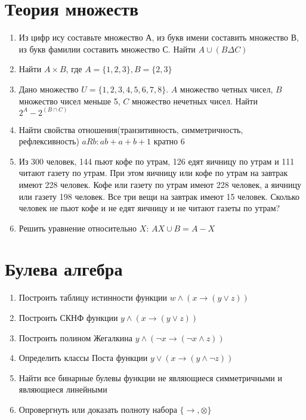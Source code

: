 \documentclass{paper}
\begin{document}
\section{Теория множеств}
\begin{enumerate}
    \item Из цифр ису составьте множество А, 
    из букв имени составить множество В, 
    из букв фамилии составить множество С. Найти $A \cup (B \Delta C)$
    \item Найти $A \times B$, где $A = \{1,2,3\}, B = \{2,3\}$
    \item Дано множество $U = \{1,2,3,4,5,6,7,8\}$. $A$ множество четных чисел, $B$ множество чисел меньше 5, $C$ множество нечетных чисел.
    Найти $2^A - 2^{(B \cap C)}$
    \item Найти свойства отношения(транзитивность, симметричность, рефлексивность) 
    $aRb: ab + a + b + 1$ кратно 6
    \item Из 300 человек, 144 пьют кофе по утрам, 126 едят яичницу по утрам и 111 читают газету по утрам.
    При этом яичницу или кофе по утрам на завтрак имеют 228 человек. 
    Кофе или газету по утрам имеют 228 человек, а яичницу или газету 198 человек.
    Все три вещи на завтрак имеют 15 человек. 
    Сколько человек не пьют кофе и не едят яичницу и не читают газеты по утрам?
    \item Решить уравнение относительно $X$: $AX \cup B = A - X$
\end{enumerate}
\section{Булева алгебра}
\begin{enumerate}
    \item Построить таблицу истинности функции $w \land (x \rightarrow (y \lor z))$
    \item Построить СКНФ функции $y \land (x \rightarrow (y \lor z))$
    \item Построить полином Жегалкина $y \land (\lnot x \rightarrow (\lnot x \land z))$
    \item Определить классы Поста функции $y \lor (x \rightarrow (y \land \lnot z))$
    \item Найти все бинарные булевы функции не являющиеся симметричными и являющиеся линейными
    \item Опровергнуть или доказать полноту набора $\{\rightarrow, \otimes\}$
\end{enumerate}
\end{document}
